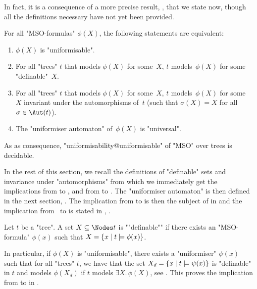 \documentclass[a4paper,UKenglish,cleveref, autoref, thm-restate]{lipics-v2021}
\begin{document}
In fact, it is a consequence of a more precise result, , that we state now, though all the definitions necessary have not yet been provided.
\begin{lemma}\label{lem:main-result}\label{lemma:main}
	For all "MSO-formulas" $\phi(X)$, the following statements are equivalent:
	\begin{enumerate}
		\item $\phi(X)$ is "uniformisable". \label{lem:main-result-1}
		\item For all "trees" $t$ that models $\phi(X)$ for some~$X$, $t$ models~$\phi(X)$ for some "definable"~$X$. \label{lem:main-result-2}
		\item For all "trees" $t$ that models $\phi(X)$ for some~$X$, $t$ models~$\phi(X)$ for some~$X$ invariant under the automorphisms of~$t$ (\ie such that $\sigma(X) = X$ for all $\sigma \in \Aut(t)$). \label{lem:main-result-3}
		\item The "uniformiser automaton" of~$\phi(X)$ is "universal". \label{lem:main-result-4}
	\end{enumerate}
	As as consequence, "uniformisability@uniformisable" of "MSO" over trees is decidable.
\end{lemma}

In the rest of this section, we recall the definitions of "definable" sets and invariance under "automorphisms" from which we immediately get the implications from
 to , and from  to . The "uniformiser automaton"
is then defined in the next section, . The implication from  to  is then the subject of
 in  and the implication from~ to  is stated in
, .

\begin{definition}\label{def:definable}
	\AP Let $t$ be a "tree". A set $X \subseteq \Nodes t$ is ""definable"" if there exists an
	"MSO-formula" $\phi(x)$ such that $X = \left\{x \mid t \models \phi(x)\right\}$.
\end{definition}

In particular, if $\phi(X)$ is "uniformisable", there exists a "uniformiser" $\psi(x)$ such that for all "trees" $t$,
we have that the set $X_d = \left\{x \mid t \models \psi(x)\right\}$ is "definable" in $t$ and models $\phi(X_d)$ if $t$ models $\exists X.\, \phi(X)$,
see .
This proves the implication from  to  in .
\end{document}
